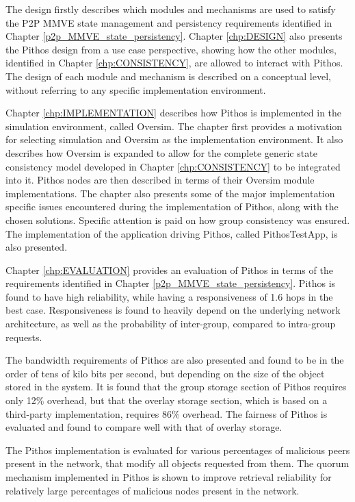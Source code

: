The design firstly describes which modules and mechanisms are used to satisfy the P2P MMVE state management and persistency requirements identified in Chapter \ref{p2p_MMVE_state_persistency}. Chapter \ref{chp:DESIGN} also presents the Pithos design from a use case perspective, showing how the other modules, identified in Chapter \ref{chp:CONSISTENCY}, are allowed to interact with Pithos. The design of each module and mechanism is described on a conceptual level, without referring to any specific implementation environment.

Chapter \ref{chp:IMPLEMENTATION} describes how Pithos is implemented in the simulation environment, called Oversim. The chapter first provides a motivation for selecting simulation and Oversim as the implementation environment. It also describes how Oversim is expanded to allow for the complete generic state consistency model developed in Chapter \ref{chp:CONSISTENCY} to be integrated into it. Pithos nodes are then described in terms of their Oversim module implementations. The chapter also presents some of the major implementation specific issues encountered during the implementation of Pithos, along with the chosen solutions. Specific attention is paid on how group consistency was ensured. The implementation of the application driving Pithos, called PithosTestApp, is also presented.

Chapter \ref{chp:EVALUATION} provides an evaluation of Pithos in terms of the requirements identified in Chapter \ref{p2p_MMVE_state_persistency}. Pithos is found to have high reliability, while having a responsiveness of 1.6 hops in the best case. Responsiveness is found to heavily depend on the underlying network architecture, as well as the probability of inter-group, compared to intra-group requests.

The bandwidth requirements of Pithos are also presented and found to be in the order of tens of kilo bits per second, but depending on the size of the object stored in the system. It is found that the group storage section of Pithos requires only 12\% overhead, but that the overlay storage section, which is based on a third-party implementation, requires 86\% overhead. The fairness of Pithos is evaluated and found to compare well with that of overlay storage.

The Pithos implementation is evaluated for various percentages of malicious peers present in the network, that modify all objects requested from them. The quorum mechanism implemented in Pithos is shown to improve retrieval reliability for relatively large percentages of malicious nodes present in the network.

